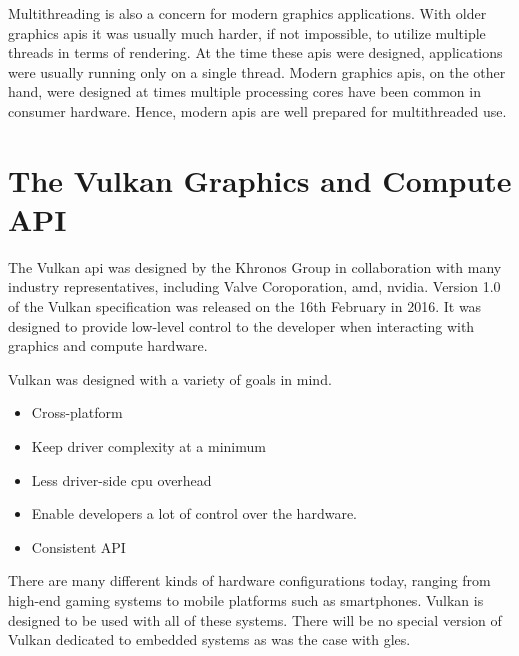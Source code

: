     Multithreading is also a concern for modern graphics applications.
    With older graphics \glspl{api} it was usually much harder, if not impossible, to utilize multiple threads in terms of rendering.
    At the time these \glspl{api} were designed, applications were usually running only on a single thread.
    Modern graphics \glspl{api}, on the other hand, were designed at times multiple processing cores have been common in consumer hardware.
    Hence, modern \glspl{api} are well prepared for multithreaded use.




  \section{The Vulkan Graphics and Compute API}

    The Vulkan \gls{api} was designed by the Khronos Group in collaboration with many industry representatives, including Valve Coroporation, \gls{amd}, \gls{nvidia}.
    Version 1.0 of the Vulkan specification was released on the 16th February in 2016.
    It was designed to provide low-level control to the developer when interacting with graphics and compute hardware.

    Vulkan was designed with a variety of goals in mind.

    \begin{itemize}
      \item Cross-platform
      \item Keep driver complexity at a minimum
      \item Less driver-side \gls{cpu} overhead
      \item Enable developers a lot of control over the hardware.
      \item Consistent API
    \end{itemize}

    There are many different kinds of hardware configurations today, ranging from high-end gaming systems to mobile platforms such as smartphones.
    Vulkan is designed to be used with all of these systems.
    There will be no special version of Vulkan dedicated to embedded systems as was the case with \gls{gles}.

